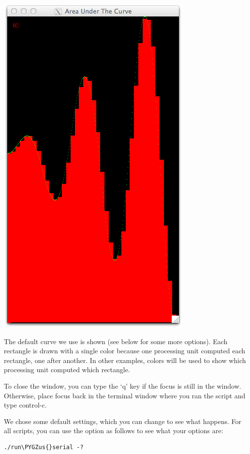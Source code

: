 \documentclass[letterpaper,10pt,openany,oneside]{sphinxmanual}
\def\PYGZus{\char`\_}
\begin{document}
\includegraphics{run_serial.png}

The default curve we use is shown (see below for some more options). Each rectangle is drawn with a single color because one processing unit computed each rectangle, one after another.  In other examples, colors will be used to show which processing unit computed which rectangle.

To close the window, you can type the `q' key if the focus is still in the window. Otherwise, place focus back in the terminal window where you ran the script and type control-c.

We chose some default settings, which you can change to see what happens. For all scripts, you can use the  option as follows to see what your options are:

\begin{Verbatim}[commandchars=\\\{\}]
./run\PYGZus{}serial -?
\end{Verbatim}
\end{document}

